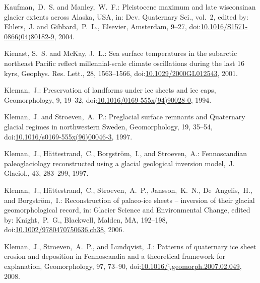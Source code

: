 \documentclass[tc, manuscript]{copernicus}
\begin{document}
\begin{thebibliography}{114}
Kaufman,~D.~S. and Manley,~W.~F.: Pleistocene maximum and late wisconsinan glacier extents across Alaska, {USA}, in: Dev. Quaternary Sci., vol.~2,
edited by: Ehlers,~J. and Gibbard,~P.~L., Elsevier, Amsterdam, 9--27,
doi:\href{http://dx.doi.org/10.1016/S1571-0866(04)80182-9}{10.1016/S1571-0866(04)80182-9}, 2004.


Kienast, S.~S. and McKay, J.~L.: Sea surface temperatures in the subarctic northeast Pacific reflect millennial-scale climate oscillations during the last 16 kyrs, Geophys. Res. Lett., 28, 1563--1566,
doi:\href{http://dx.doi.org/10.1029/2000GL012543}{10.1029/2000GL012543}, 2001.


Kleman,~J.: Preservation of landforms under ice sheets and ice caps, Geomorphology, 9, 19--32,
doi:\href{http://dx.doi.org/10.1016/0169-555x(94)90028-0}{10.1016/0169-555x(94)90028-0}, 1994.


Kleman,~J. and Stroeven,~A.~P.: Preglacial surface remnants and Quaternary glacial regimes in northwestern Sweden, Geomorphology, 19, 35--54,
doi:\href{http://dx.doi.org/10.1016/s0169-555x(96)00046-3}{10.1016/s0169-555x(96)00046-3}, 1997.


Kleman,~J., H{\"a}ttestrand,~C., Borgstr{\"o}m,~I., and Stroeven,~A.: Fennoscandian paleoglaciology reconstructed using a glacial geological inversion model,~J. Glaciol., 43, 283--299, 1997.


Kleman,~J., H{\"a}ttestrand,~C., Stroeven,~A.~P., Jansson,~K.~N., De~Angelis,~H., and Borgstr{\"o}m,~I.: Reconstruction of palaeo-ice sheets -- inversion of their glacial geomorphological record, in: Glacier Science and Environmental Change, edited by: Knight,~P.~G., Blackwell, Malden, MA, 192--198,
doi:\href{http://dx.doi.org/10.1002/9780470750636.ch38}{10.1002/9780470750636.ch38}, 2006.


Kleman,~J., Stroeven,~A.~P., and Lundqvist,~J.: Patterns of quaternary ice sheet erosion and deposition in Fennoscandia and a theoretical framework for explanation, Geomorphology, 97, 73--90,
doi:\href{http://dx.doi.org/10.1016/j.geomorph.2007.02.049}{10.1016/j.geomorph.2007.02.049}, 2008.



\end{thebibliography}
\end{document}
